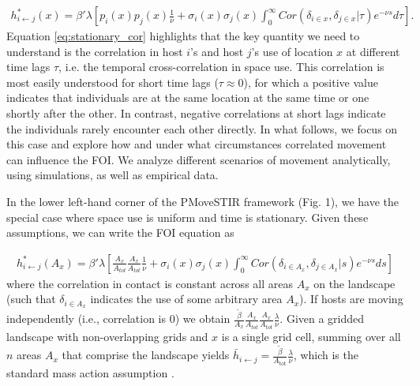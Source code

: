 \documentclass[letterpaper]{article}
\begin{document}
\begin{equation}
    \begin{aligned}
    h^*_{i \leftarrow j}(x) = \beta' \lambda \left[ p_i(x)p_j(x) \frac{1}{\nu} + \sigma_i(x) \sigma_j(x) \int_{0}^{\infty} Cor(\delta_{i \in x}, \delta_{j \in x} | \tau) e^{-\nu s} d\tau\right].
    \end{aligned}
    \label{eq:stationary_cor}
\end{equation}
Equation \ref{eq:stationary_cor} highlights that the key quantity we need to understand is the correlation in host $i$'s and host $j$'s use of location $x$ at different time lags $\tau$, i.e. the temporal cross-correlation in space use.
This correlation is most easily understood for short time lags ($\tau\approx0$), for which a positive value indicates that individuals are at the same location at the same time or one shortly after the other. In contrast, negative correlations at short lags indicate the individuals rarely encounter each other directly.
In what follows, we focus on this case and explore how and under what circumstances correlated movement can influence the FOI. We analyze different scenarios of movement analytically, using simulations, as well as empirical data.

In the lower left-hand corner of the PMoveSTIR framework (Fig. 1), we have the special case where space use is uniform and time is stationary. 
Given these assumptions, we can write the FOI equation as

\begin{equation}
    \begin{aligned}
        h^*_{i \leftarrow j}(A_x) = \beta' \lambda \left[\frac{A_x}{A_{tot}}\frac{A_x}{A_{tot}} \frac{1}{\nu} + \sigma_i(x) \sigma_j(x) \int_{0}^{\infty} Cor(\delta_{i \in A_x}, \delta_{j \in A_x} | s) e^{-\nu s} ds\right]
    \end{aligned}
    \label{eq:uniform_stationary1}
\end{equation}
where the correlation in contact is constant across all areas $A_x$ on the landscape (such that $\delta_{i \in A_x}$ indicates the use of some arbitrary area $A_x$).  
If hosts are moving independently (i.e., correlation is 0) we obtain $\frac{\tilde{\beta}}{A_x} \frac{A_x}{A_{tot}} \frac{A_x}{A_{tot}}  \frac{\lambda}{\nu}$. Given a gridded landscape with non-overlapping grids and $x$ is a single grid cell, summing over all $n$ areas $A_x$ that comprise the landscape yields $\bar{h}_{i \leftarrow j} =\frac{\tilde{\beta}}{A_\text{tot}} \frac{\lambda}{\nu}$, which is the standard mass action assumption \citep{McCallum2001}. 
\end{document}
